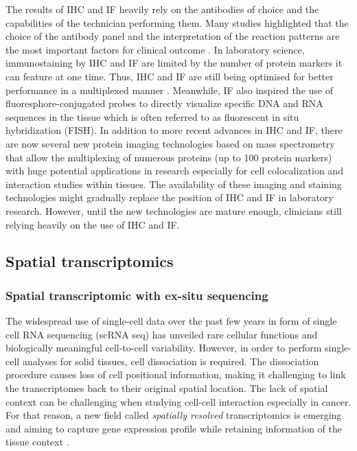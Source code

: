 The results of IHC and IF heavily rely on the antibodies of choice and the capabilities of the technician performing them. Many studies highlighted that the choice of the antibody panel and the interpretation of the reaction patterns are the most important factors for  clinical outcome \cite{de2010immunohistochemistry, jensen1997immunohistochemistry}. In laboratory science, immunostaining by IHC and IF are limited by the number of protein markers it can feature at one time. Thus, IHC and IF are still being optimised for better performance in a multiplexed manner \cite{joshi2017immunofluorescence}. Meanwhile, IF also inspired the use of fluoresphore-conjugated probes to directly visualize specific DNA and RNA sequences in the tissue which is often referred to as fluorescent in situ hybridization (FISH). In addition to more recent advances in IHC and IF, there are now several new protein imaging technologies based on mass spectrometry that allow the multiplexing of numerous proteins (up to 100 protein markers) with huge potential applications in research especially for cell colocalization and interaction studies within tissues. The availability of these imaging and staining technologies might gradually replace the position of IHC and IF in laboratory research. However, until the new technologies are mature enough, clinicians still relying heavily on the use of IHC and IF. 

\subsection{Spatial transcriptomics}
\subsubsection{Spatial transcriptomic with ex-situ sequencing}
\label{subsec:ST_seq}
The widespread use of single-cell data over the past few years in form of single cell RNA sequencing (scRNA seq) has unveiled rare cellular functions and biologically meaningful cell-to-cell variability. However, in order to perform single-cell analyses for solid tissues, cell dissociation is required. The dissociation procedure causes loss of cell positional information, making it challenging to link the transcriptomes back to their original spatial location. The lack of spatial context can be challenging when studying cell-cell interaction especially in cancer. For that reason, a new field called \textit{spatially resolved} transcriptomics is emerging and aiming to capture gene expression profile while retaining information of the tissue context \cite{burgess2019spatial}. 

